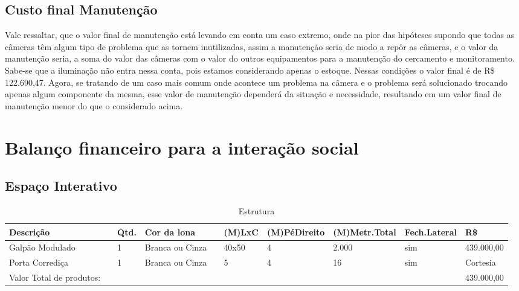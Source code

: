 \subsection{Custo final Manutenção}

	Vale ressaltar, que o valor final de manutenção está levando em conta um caso extremo, onde na pior das hipóteses supondo que todas as câmeras têm algum tipo de problema que as tornem inutilizadas, assim a manutenção seria de modo a repôr as câmeras, e o valor da manutenção seria, a soma do valor das câmeras com o valor do outros equipamentos para a manutenção do cercamento e monitoramento. Sabe-se que a iluminação não entra nessa conta, pois estamos considerando apenas o estoque. Nessas condições o valor final é de R\$ 122.690,47. Agora, se tratando de um caso mais comum onde acontece um problema na câmera e o problema será solucionado trocando apenas algum componente da mesma, esse valor de manutenção dependerá da situação e necessidade, resultando em um valor final de manutenção menor do que o considerado acima.
	
\section{Balanço financeiro para a interação social}

\subsection{Espaço Interativo}

\begin{table}[h]
\centering
\caption{Estrutura}
\label{Estrutura}
\begin{tabular}{llllllllll} \\ \hline
Descrição                &  & Qtd. & Cor da lona     &  & (M)LxC & (M)PéDireito & (M)Metr.Total & Fech.Lateral & R\$        \\ \hline
Galpão Modulado          &  & 1    & Branca ou Cinza &  & 40x50  & 4            & 2.000         & sim          & 439.000,00 \\ \hline
Porta Corrediça          &  & 1    & Branca ou Cinza &  & 5      & 4            & 16            & sim          & Cortesia   \\ \hline
Valor Total de produtos: &  &      &                 &  &        &              &               &              & 439.000,00  \\ \hline
\end{tabular}
\end{table}


